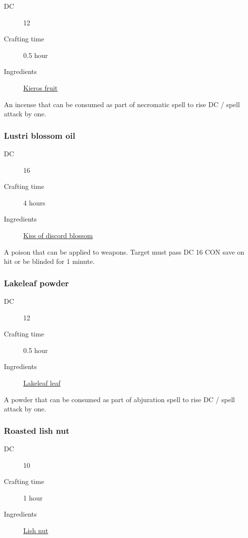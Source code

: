 \begin{description}
\item [DC] 12
\item [Crafting time] 0.5 hour
\item [Ingredients] \hyperref[Kieros]{Kieros fruit}
\end{description}

An incense that can be consumed as part of necromatic spell to rise DC / spell attack by one.

\subsubsection{Lustri blossom oil}
\label{Lustri blossom oil}

\begin{description}
\item [DC] 16
\item [Crafting time] 4 hours
\item [Ingredients] \hyperref[Kiss of Discord]{Kiss of discord blossom}
\end{description}

A poison that can be applied to weapons. Target must pass DC 16 CON save on hit or be blinded for 1 minute.

\subsubsection{Lakeleaf powder}
\label{Lakeleaf powder}

\begin{description}
\item [DC] 12
\item [Crafting time] 0.5 hour
\item [Ingredients] \hyperref[Lakeleaf]{Lakeleaf leaf}
\end{description}

A powder that can be consumed as part of abjuration spell to rise DC / spell attack by one.

\subsubsection{Roasted lish nut}
\label{Roasted lish nut}

\begin{description}
\item [DC] 10
\item [Crafting time] 1 hour
\item [Ingredients] \hyperref[Lish]{Lish nut}
\end{description}

